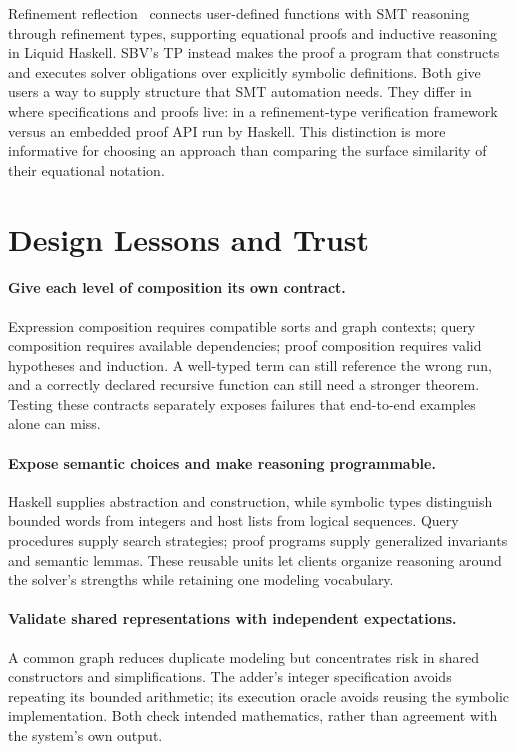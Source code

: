 \documentclass[acmsmall,screen,nonacm]{acmart}
\begin{document}
Refinement reflection~\citep{reflection} connects user-defined functions with
SMT reasoning through refinement types, supporting equational proofs and
inductive reasoning in Liquid Haskell. SBV's TP instead makes the proof a
program that constructs and executes solver obligations over explicitly
symbolic definitions. Both give users a way to supply structure that SMT
automation needs. They differ in where specifications and proofs live: in a
refinement-type verification framework versus an embedded proof API run by
Haskell. This distinction is more informative for choosing an approach than
comparing the surface similarity of their equational notation.

\section{Design Lessons and Trust}
\label{sec:lessons}

\paragraph{Give each level of composition its own contract.}
Expression composition requires compatible sorts and graph contexts; query
composition requires available dependencies; proof composition requires valid
hypotheses and induction. A well-typed term can still reference the wrong run,
and a correctly declared recursive function can still need a stronger theorem.
Testing these contracts separately exposes failures that end-to-end examples
alone can miss.

\paragraph{Expose semantic choices and make reasoning programmable.}
Haskell supplies abstraction and construction, while symbolic types distinguish
bounded words from integers and host lists from logical sequences. Query
procedures supply search strategies; proof programs supply generalized invariants
and semantic lemmas. These reusable units let clients organize reasoning around
the solver's strengths while retaining one modeling vocabulary.

\paragraph{Validate shared representations with independent expectations.}
A common graph reduces duplicate modeling but concentrates risk in shared
constructors and simplifications. The adder's integer specification avoids
repeating its bounded arithmetic; its execution oracle avoids reusing the
symbolic implementation. Both check intended mathematics, rather than agreement
with the system's own output.
\end{document}
